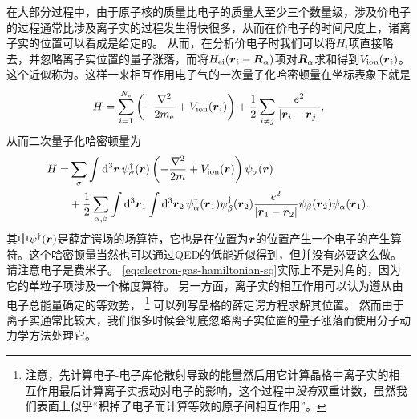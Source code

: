 在大部分过程中，由于原子核的质量比电子的质量大至少三个数量级，涉及价电子的过程通常比涉及离子实的过程发生得快很多，从而在价电子的时间尺度上，诸离子实的位置可以看成是给定的。
从而，在分析价电子时我们可以将${H}_i$项直接略去，并忽略离子实位置的量子涨落，而将${H}_\text{ei}(\vb*{r}_i-\vb*{R}_\alpha)$项对$\vb*{R}_\alpha$求和得到$V_\text{ion}(\vb*{r}_i)$。这个近似称为。这样一来相互作用电子气的一次量子化哈密顿量在坐标表象下就是
\begin{equation}
    {H} = \sum_{i=1}^{N_\text{e}} \left( - \frac{\laplacian}{2m_\text{e}} + V_\text{ion}(\vb*{r}_i)\right) + \frac{1}{2} \sum_{i\neq j} \frac{e^2}{\abs{\vb*{r}_i - \vb*{r}_j}},
    \label{eq:electron-gas-hamiltonian}
\end{equation}
从而二次量子化哈密顿量为
\begin{equation}
    \begin{aligned}
        {H} = &\sum_{\sigma} \int \dd[3]{\vb*{r}} {\psi}_\sigma^\dagger(\vb*{r}) \left( - \frac{\laplacian}{2m} + V_\text{ion}(\vb*{r}) \right) {\psi}_\sigma(\vb*{r}) \\
        &+ \frac{1}{2} \sum_{\alpha, \beta} \int \dd[3]{\vb*{r}_1} \int \dd[3]{\vb*{r}_2} 
        {\psi}_\alpha^\dagger (\vb*{r}_1) {\psi}_\beta^\dagger (\vb*{r}_2) \frac{e^2}{\abs{\vb*{r}_1 - \vb*{r}_2}} {\psi}_\beta (\vb*{r}_2) {\psi}_\alpha (\vb*{r}_1). 
    \end{aligned}
    \label{eq:electron-gas-hamiltonian-sq}
\end{equation}
其中${\psi}^\dagger(\vb*{r})$是薛定谔场的场算符，它也是在位置为$\vb*{r}$的位置产生一个电子的产生算符。这个哈密顿量当然也可以通过QED的低能近似得到，但并没有必要这么做。请注意电子是费米子。
\eqref{eq:electron-gas-hamiltonian-sq}实际上不是对角的，因为它的单粒子项涉及一个梯度算符。
另一方面，离子实的相互作用可以认为遵从由电子总能量确定的等效势，%
\footnote{
    注意，先计算电子-电子库伦散射导致的能量然后用它计算晶格中离子实的相互作用最后计算离子实振动对电子的影响，这个过程中\emph{没有}双重计数，虽然我们表面上似乎“积掉了电子而计算等效的原子间相互作用”。
}%
可以列写晶格的薛定谔方程求解其位置。
然而由于离子实通常比较大，我们很多时候会彻底忽略离子实位置的量子涨落而使用分子动力学方法处理它。

